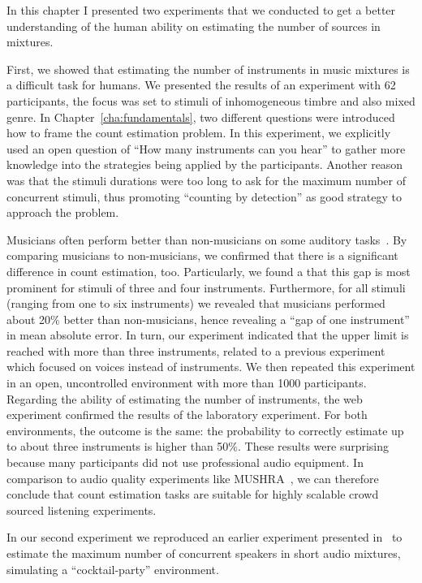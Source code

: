 In this chapter I presented two experiments that we conducted to get a better understanding of the human ability on estimating the number of sources in mixtures.
\par
First, we showed that estimating the number of instruments in music mixtures is a difficult task for humans.
We presented the results of an experiment with 62 participants, the focus was set to stimuli of inhomogeneous timbre and also mixed genre. 
In Chapter~\ref{cha:fundamentals}, two different questions were introduced how to frame the count estimation problem. 
In this experiment, we explicitly used an open question of ``How many instruments can you hear'' to gather more knowledge into the strategies being applied by the participants.
Another reason was that the stimuli durations were too long to ask for the maximum number of concurrent stimuli, thus promoting ``counting by detection'' as good strategy to approach the problem.\par
Musicians often perform better than non-musicians on some auditory tasks~\cite{kishon01}.
By comparing musicians to non-musicians, we confirmed that there is a significant difference in count estimation, too.
Particularly, we found a that this gap is most prominent for stimuli of three and four instruments. 
Furthermore, for all stimuli (ranging from one to six instruments) we revealed that musicians performed about 20\% better than non-musicians, hence revealing a ``gap of one instrument'' in mean absolute error.
In turn, our experiment indicated that the upper limit is reached with more than three instruments, related to a previous experiment~\cite{huron89} which focused on voices instead of instruments.
We then repeated this experiment in an open, uncontrolled environment with more than 1000 participants.
Regarding the ability of estimating the number of instruments, the web experiment confirmed the results of the laboratory experiment. 
For both environments, the outcome is the same: the probability to correctly estimate up to about three instruments is higher than 50\%.
These results were surprising because many participants did not use professional audio equipment.
In comparison to audio quality experiments like MUSHRA~\cite{recommendation2001MUSHRA}, we can therefore conclude that count estimation tasks are suitable for highly scalable crowd sourced listening experiments.
\par
In our second experiment we reproduced an earlier experiment presented in~\cite{kawashima15} to estimate the maximum number of concurrent speakers in short audio mixtures, simulating a ``cocktail-party'' environment.
